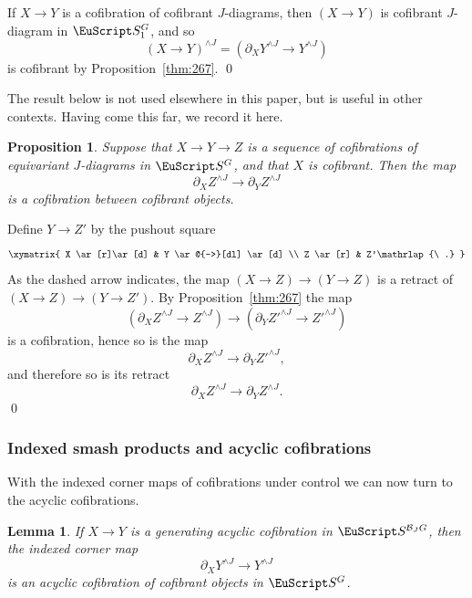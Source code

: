 \documentclass{amsart}
\newtheorem{lem}[equation]{Lemma}
\newtheorem{prop}[equation]{Proposition}
\theoremstyle{definition}
\theoremstyle{remark}
\newenvironment{pf}{\bigskip{\em Proof:\/}}{\qed\medskip}
\newcommand{\spectra}{\EuScript S}
\newcommand{\ugspectra}[1]{\spectra^{#1}}
\newcommand{\cat}[1]{{\mathcal #1}}
\newcommand{\augspectra}[1]{\spectra_{1}^{#1}}
\begin{document}
\begin{pf}
If $X\to Y$ is a cofibration of cofibrant $J$-diagrams, then $(X\to
Y)$ is cofibrant $J$-diagram in $\augspectra{G}$, and so
\[
(X\to Y)^{\wedge J} = (\partial_{X}Y^{\wedge J}\to Y^{\wedge J})
\]
is cofibrant by Proposition~\ref{thm:267}.  
\end{pf}

The result below is not used elsewhere in this paper, but is useful in
other contexts.   Having come this far, we record it here.

\begin{prop}
\label{thm:270}
Suppose that $X\to Y\to Z$ is a sequence of cofibrations of
equivariant $J$-diagrams in $\ugspectra{G}$, and that $X$ is
cofibrant.   Then the map 
\[
\partial_{X}Z^{\wedge J} \to \partial_{Y}Z^{\wedge J}
\]
is a cofibration between cofibrant objects.   
\end{prop}

\begin{pf}
Define $Y\to Z'$ by the pushout square
\[
\xymatrix{
X  \ar[r]\ar[d]  & Y \ar@{-->}[dl]
\ar[d] \\
Z  \ar[r]        & Z'\mathrlap{\ .}
}
\]
As the dashed arrow indicates, the map $(X\to Z)\to (Y\to Z)$ is a
retract of $(X\to Z)\to (Y\to Z')$.  By Proposition~\ref{thm:267} the
map
\[
(\partial_{X}Z^{\wedge J}\to Z^{\wedge J}) \to 
(\partial_{Y}Z'^{\wedge J}\to Z'^{\wedge J}) 
\]
is a cofibration, hence so is the map 
\[
\partial_{X}Z^{\wedge J} \to 
\partial_{Y}Z'^{\wedge J},
\]
and therefore so is its retract
\[
\partial_{X}Z^{\wedge J} \to 
\partial_{Y}Z^{\wedge J}.
\]
\end{pf}

\subsubsection{Indexed smash products and  acyclic cofibrations}
\label{sec:indexed-corner-maps}

With the indexed corner maps of cofibrations under control we can now
turn to the acyclic cofibrations.   

\begin{lem}
\label{thm:233}
If $X\to Y$ is a generating acyclic cofibration in
$\spectra^{\cat{B}_{J}G}$, then the indexed corner map
\[
\partial_{X}Y^{\wedge J}\to
Y^{\wedge J}
\]
is an acyclic cofibration of cofibrant objects in $\ugspectra{G}$.
\end{lem}
\end{document}
